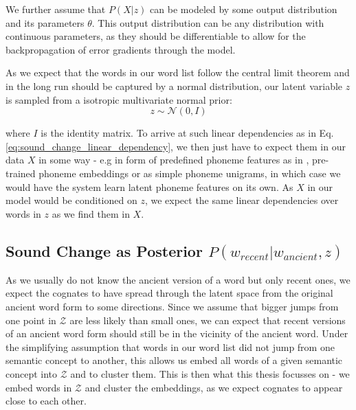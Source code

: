 \documentclass[8pt]{article}
\begin{document}
We further assume that $P(X|z)$ can be modeled by some output distribution and its parameters $\theta$.  This output distribution can be any distribution with continuous parameters, as they should be differentiable to allow for the backpropagation of error gradients through the model. 
%

As we expect that the words in our word list follow the central limit theorem and in the long run should be captured by a normal distribution, our latent variable $z$ is sampled from a isotropic multivariate normal prior:
\begin{equation}
z \sim \mathcal{N}(0,I)
\end{equation}

where $I$ is the identity matrix.
To arrive at such linear dependencies as in Eq. \ref{eq:sound_change_linear_dependency}, we then just have to expect them in our data $X$ in some way - e.g in form of predefined phoneme features as in \cite{kondrak2000new,list2012sca,rama2016siamese}, pre-trained phoneme embeddings or as simple phoneme unigrams, in which case we would have the system learn latent phoneme features on its own. As $X$ in our model would be conditioned on $z$, we expect the same linear dependencies over words in $z$ as we find them in $X$.


\subsection{Sound Change as Posterior $P(w_{recent}|w_{ancient},z)$ }


As we usually do not know the ancient version of a word but only recent ones, we expect the cognates to have spread through the latent space from the original ancient word form to some directions. Since we assume that bigger jumps from one point in $\mathcal{Z}$ are less likely than small ones, we can expect that recent versions of an ancient word form should still be in the vicinity of the ancient word. Under the simplifying assumption that words in our word list did not jump from one semantic concept to another, this allows us embed all words of a given semantic concept into $\mathcal{Z}$ and to cluster them. This is then what this thesis focusses on - we embed words in $\mathcal{Z}$ and cluster the embeddings, as we expect cognates to appear close to each other.
\end{document}
